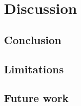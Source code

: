 \documentclass[UKenglish]{uiomasterthesis}
\begin{document}
\chapter{Discussion}

\section{Conclusion}

\section{Limitations}

\section{Future work}


\printbibliography{}
\end{document}
